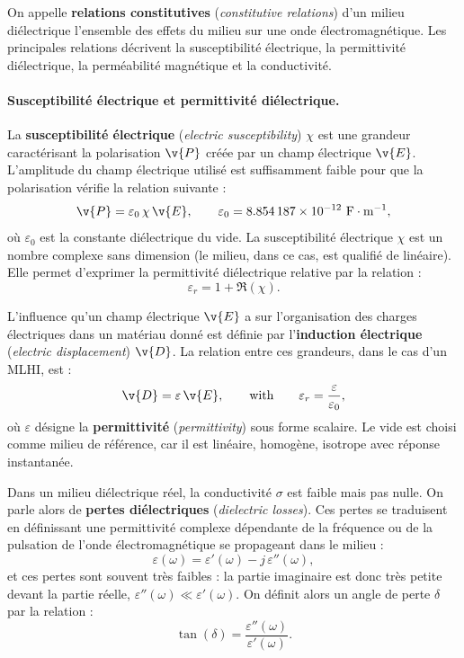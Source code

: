 On appelle \textbf{relations constitutives} (\textit{constitutive relations})
d'un milieu diélectrique l'ensemble des effets du milieu sur une onde
électromagnétique. Les principales relations décrivent la susceptibilité
électrique, la permittivité diélectrique, la perméabilité magnétique et la
conductivité.

\paragraph{Susceptibilité électrique et permittivité diélectrique.}
La \textbf{susceptibilité électrique} (\textit{electric susceptibility}) $\chi$
est une grandeur caractérisant la polarisation $\v{P}$ créée par un champ
électrique $\v{E}$. L'amplitude du champ électrique utilisé est suffisamment
faible pour que la polarisation vérifie la relation suivante :
\[
  \v{P} = \varepsilon_0\,\chi\,\v{E},
  \qquad \varepsilon_0 = 8.854\,187\times 10^{-12}\ \text{F}\cdot\text{m}^{-1},
\]
où $\varepsilon_0$ est la constante diélectrique du vide. La susceptibilité
électrique $\chi$ est un nombre complexe sans dimension (le milieu, dans ce cas,
est qualifié de linéaire). Elle permet d'exprimer la permittivité diélectrique
relative par la relation :
\[
  \varepsilon_r = 1 + \Re(\chi).
\]

L'influence qu'un champ électrique $\v{E}$ a sur l'organisation des charges
électriques dans un matériau donné est définie par l'\textbf{induction
électrique} (\textit{electric displacement}) $\v{D}$. La relation entre ces
grandeurs, dans le cas d'un MLHI, est :
\[
  \v{D} = \varepsilon\,\v{E},
  \qquad\text{with}\qquad
  \varepsilon_r = \frac{\varepsilon}{\varepsilon_0},
\]
où $\varepsilon$ désigne la \textbf{permittivité} (\textit{permittivity}) sous
forme scalaire. Le vide est choisi comme milieu de référence, car il est
linéaire, homogène, isotrope avec réponse instantanée.

\begin{definition}
  Dans un milieu diélectrique réel, la conductivité $\sigma$ est faible mais pas
  nulle. On parle alors de \textbf{pertes diélectriques} (\textit{dielectric
  losses}). Ces pertes se traduisent en définissant une permittivité complexe
  dépendante de la fréquence ou de la pulsation de l'onde électromagnétique se
  propageant dans le milieu :
  \[
    \varepsilon(\omega) = \varepsilon'(\omega) - j\,\varepsilon''(\omega),
  \]
  et ces pertes sont souvent très faibles : la partie imaginaire est donc très
  petite devant la partie réelle, $\varepsilon''(\omega) \ll
  \varepsilon'(\omega)$. On définit alors un angle de perte $\delta$ par la
  relation :
  \[
    \tan(\delta) = \frac{\varepsilon''(\omega)}{\varepsilon'(\omega)}.
  \]
\end{definition}

